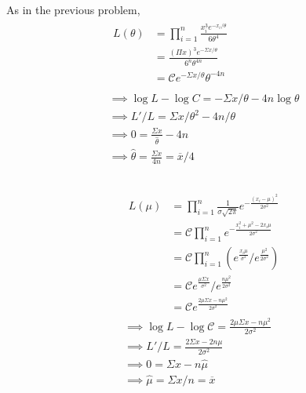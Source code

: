 \documentclass[twocolumn]{article}
\numberwithin{equation}{section}
\begin{document}
As in the previous problem,\begin{gather*}
\begin{aligned}
L(\theta)&=\prod_{i=1}^n\frac{x_i^3e^{-x_i/\theta}}{6\theta^4}\\
&=\frac{(\Pi x)^3e^{-\Sigma x/\theta}}{6^n\theta^{4n}}\\
&=\mathcal{C}e^{-\Sigma x/\theta}\theta^{-4n}\\
\end{aligned}\\
\implies \log L-\log C=-\Sigma x/\theta-4n\log\theta\\
\implies L'/L=\Sigma x/\theta^2-4n/\theta\\
\implies 0=\frac{\Sigma x}{\hat{\theta}}-4n\\
\implies \hat{\theta}=\frac{\Sigma x}{4n}=\overline{x}/4
\end{gather*}

\subsection{}\begin{gather*}
\begin{aligned}
L(\mu)&=\prod_{i=1}^n\frac{1}{\sigma\sqrt{2\pi}}e^{-\frac{(x_i-\mu)^2}{2\sigma^2}}\\
&=\mathcal{C}\prod_{i=1}^ne^{-\frac{x_i^2+\mu^2-2x_i\mu}{2\sigma^2}}\\
&=\mathcal{C}\prod_{i=1}^n(e^{\frac{x_i\mu}{\sigma^2}}/e^{\frac{\mu^2}{2\sigma^2}})\\
&=\mathcal{C}e^{\frac{\mu\Sigma x}{\sigma^2}}/e^{\frac{n\mu^2}{2\sigma^2}}\\
&=\mathcal{C}e^\frac{2\mu\Sigma x-n\mu^2}{2\sigma^2}
\end{aligned}\\
\implies \log L-\log\mathcal{C}=\frac{2\mu\Sigma x-n\mu^2}{2\sigma^2}\\
\implies L'/L=\frac{2\Sigma x- 2n\mu}{2\sigma^2}\\
\implies 0=\Sigma x-n\hat{\mu}\\
\implies \hat{\mu}=\Sigma x/n=\overline{x}
\end{gather*}
\end{document}
